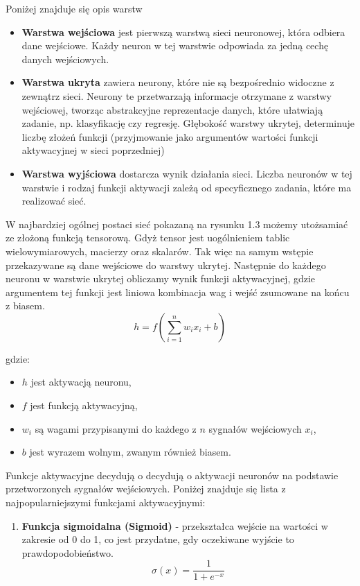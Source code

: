 \begin{enumerate}
Poniżej znajduje się opis warstw
\begin{itemize}
    \item \textbf{Warstwa wejściowa} jest pierwszą warstwą sieci neuronowej, która odbiera dane wejściowe. Każdy neuron w tej warstwie odpowiada za jedną cechę danych wejściowych.
    \item \textbf{Warstwa ukryta} zawiera neurony, które nie są bezpośrednio widoczne z zewnątrz sieci. Neurony te przetwarzają informacje otrzymane z warstwy wejściowej, tworząc abstrakcyjne reprezentacje danych, które ułatwiają zadanie, np. klasyfikację czy regresję. Głębokość warstwy ukrytej, determinuje liczbę złożeń funkcji  (przyjmowanie jako argumentów wartości funkcji aktywacyjnej w sieci poprzedniej) 
    \item \textbf{Warstwa wyjściowa} dostarcza wynik działania sieci. Liczba neuronów w tej warstwie i rodzaj funkcji aktywacji zależą od specyficznego zadania, które ma realizować sieć.
\end{itemize}

W najbardziej ogólnej postaci sieć pokazaną na rysunku 1.3 możemy utożsamiać ze złożoną funkcją tensorową. Gdyż tensor jest uogólnieniem tablic wielowymiarowych, macierzy oraz skalarów. Tak więc na samym wstępie przekazywane są dane wejściowe do  warstwy ukrytej. Następnie do każdego neuronu w warstwie ukrytej obliczamy wynik funkcji aktywacyjnej, gdzie argumentem tej funkcji jest liniowa kombinacja wag i wejść zsumowane na końcu z biasem. 
\begin{equation}
    h = f\left(\sum_{i=1}^{n} w_i x_i + b\right)
\end{equation}

gdzie:
\begin{itemize}
    \item $h$ jest aktywacją neuronu,
    \item $f$ jest funkcją aktywacyjną,
    \item $w_i$ są wagami przypisanymi do każdego z $n$ sygnałów wejściowych $x_i$,
    \item $b$ jest wyrazem wolnym, zwanym również biasem.
\end{itemize}
Funkcje aktywacyjne decydują o decydują o aktywacji neuronów na podstawie przetworzonych sygnałów wejściowych. Poniżej znajduje się lista z najpopularniejszymi funkcjami aktywacyjnymi:

\begin{enumerate}[label=\textbf{\arabic*.}]
    \item \textbf{Funkcja sigmoidalna (Sigmoid)} - przekształca wejście na wartości w zakresie od 0 do 1, co jest przydatne, gdy oczekiwane wyjście to prawdopodobieństwo.
    \[ \sigma(x) = \frac{1}{1 + e^{-x}} \]
    

\end{enumerate}
\end{enumerate}
